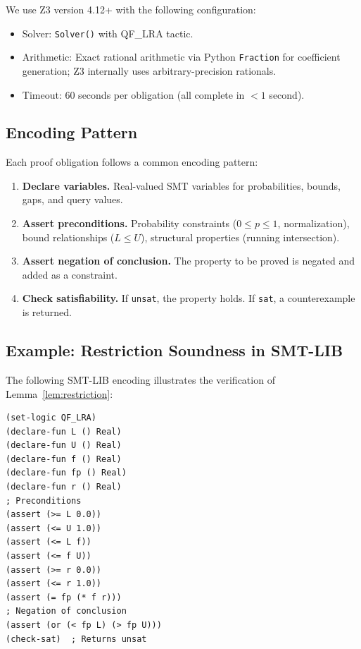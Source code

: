 \documentclass[11pt,a4paper]{article}
\begin{document}
We use Z3 version 4.12+ with the following configuration:
\begin{itemize}[nosep]
\item Solver: \texttt{Solver()} with QF\_LRA tactic.
\item Arithmetic: Exact rational arithmetic via Python \texttt{Fraction} for coefficient generation; Z3 internally uses arbitrary-precision rationals.
\item Timeout: 60 seconds per obligation (all complete in $< 1$ second).
\end{itemize}

\subsection{Encoding Pattern}

Each proof obligation follows a common encoding pattern:

\begin{enumerate}[nosep]
\item \textbf{Declare variables.} Real-valued SMT variables for probabilities, bounds, gaps, and query values.
\item \textbf{Assert preconditions.} Probability constraints ($0 \leq p \leq 1$, normalization), bound relationships ($L \leq U$), structural properties (running intersection).
\item \textbf{Assert negation of conclusion.} The property to be proved is negated and added as a constraint.
\item \textbf{Check satisfiability.} If \texttt{unsat}, the property holds. If \texttt{sat}, a counterexample is returned.
\end{enumerate}

\subsection{Example: Restriction Soundness in SMT-LIB}

The following SMT-LIB encoding illustrates the verification of Lemma~\ref{lem:restriction}:

\begin{small}
\begin{verbatim}
(set-logic QF_LRA)
(declare-fun L () Real)
(declare-fun U () Real)
(declare-fun f () Real)
(declare-fun fp () Real)
(declare-fun r () Real)
; Preconditions
(assert (>= L 0.0))
(assert (<= U 1.0))
(assert (<= L f))
(assert (<= f U))
(assert (>= r 0.0))
(assert (<= r 1.0))
(assert (= fp (* f r)))
; Negation of conclusion
(assert (or (< fp L) (> fp U)))
(check-sat)  ; Returns unsat
\end{verbatim}
\end{small}
\end{document}
